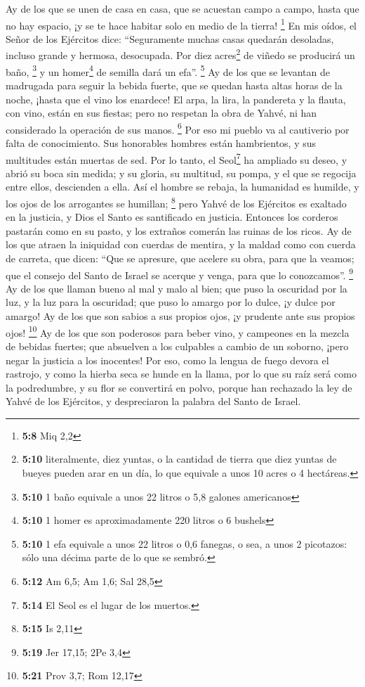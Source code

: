\begin{paracol}{2}
 Ay de los que se unen de casa en casa, que se acuestan
campo a campo, hasta que no hay espacio, ¡y se te hace habitar solo en
medio de la tierra! \footnote{\textbf{5:8} Miq 2,2}  En
mis oídos, el Señor de los Ejércitos dice: ``Seguramente muchas casas
quedarán desoladas, incluso grande y hermosa, desocupada.
 Por diez acres\footnote{\textbf{5:10} literalmente, diez
  yuntas, o la cantidad de tierra que diez yuntas de bueyes pueden arar
  en un día, lo que equivale a unos 10 acres o 4 hectáreas.} de viñedo
se producirá un baño, \footnote{\textbf{5:10} 1 baño equivale a unos 22
  litros o 5,8 galones americanos} y un homer\footnote{\textbf{5:10} 1
  homer es aproximadamente 220 litros o 6 bushels} de semilla dará un
efa''. \footnote{\textbf{5:10} 1 efa equivale a unos 22 litros o 0,6
  fanegas, o sea, a unos 2 picotazos: sólo una décima parte de lo que se
  sembró.}  Ay de los que se levantan de madrugada para
seguir la bebida fuerte, que se quedan hasta altas horas de la noche,
¡hasta que el vino los enardece!  El arpa, la lira, la
pandereta y la flauta, con vino, están en sus fiestas; pero no respetan
la obra de Yahvé, ni han considerado la operación de sus manos.
\footnote{\textbf{5:12} Am 6,5; Am 1,6; Sal 28,5}  Por
eso mi pueblo va al cautiverio por falta de conocimiento. Sus honorables
hombres están hambrientos, y sus multitudes están muertas de sed.
 Por lo tanto, el Seol\footnote{\textbf{5:14} El Seol es
  el lugar de los muertos.} ha ampliado su deseo, y abrió su boca sin
medida; y su gloria, su multitud, su pompa, y el que se regocija entre
ellos, descienden a ella.  Así el hombre se rebaja, la
humanidad es humilde, y los ojos de los arrogantes se humillan;
\footnote{\textbf{5:15} Is 2,11}  pero Yahvé de los
Ejércitos es exaltado en la justicia, y Dios el Santo es santificado en
justicia.  Entonces los corderos pastarán como en su
pasto, y los extraños comerán las ruinas de los ricos. 
Ay de los que atraen la iniquidad con cuerdas de mentira, y la maldad
como con cuerda de carreta,  que dicen: ``Que se
apresure, que acelere su obra, para que la veamos; que el consejo del
Santo de Israel se acerque y venga, para que lo conozcamos''.
\footnote{\textbf{5:19} Jer 17,15; 2Pe 3,4}  Ay de los
que llaman bueno al mal y malo al bien; que puso la oscuridad por la
luz, y la luz para la oscuridad; que puso lo amargo por lo dulce, ¡y
dulce por amargo!  Ay de los que son sabios a sus propios
ojos, ¡y prudente ante sus propios ojos! \footnote{\textbf{5:21} Prov
  3,7; Rom 12,17}  Ay de los que son poderosos para beber
vino, y campeones en la mezcla de bebidas fuertes;  que
absuelven a los culpables a cambio de un soborno, ¡pero negar la
justicia a los inocentes!  Por eso, como la lengua de
fuego devora el rastrojo, y como la hierba seca se hunde en la llama,
por lo que su raíz será como la podredumbre, y su flor se convertirá en
polvo, porque han rechazado la ley de Yahvé de los Ejércitos, y
despreciaron la palabra del Santo de Israel.


\end{paracol}
